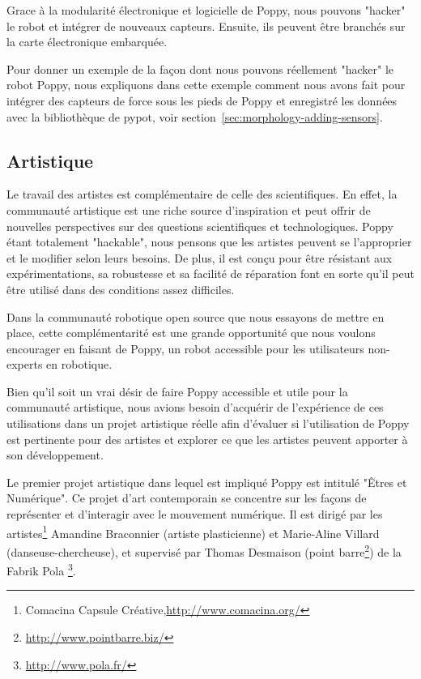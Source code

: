 \begin{description}
    Grace à la modularité électronique et logicielle de Poppy, nous pouvons "hacker" le robot et intégrer de nouveaux capteurs. Ensuite, ils peuvent être branchés sur la carte électronique embarquée.

    Pour donner un exemple de la façon dont nous pouvons réellement "hacker" le robot Poppy, nous expliquons dans cette exemple comment nous avons fait pour intégrer des capteurs de force sous les pieds de Poppy et enregistré les données avec la bibliothèque de pypot, voir section~\ref{sec:morphology-adding-sensors}.
\end{description}

\subsection*{Artistique} %

Le travail des artistes est complémentaire de celle des scientifiques. En effet, la communauté artistique est une riche source d'inspiration et peut offrir de nouvelles perspectives sur des questions scientifiques et technologiques. 
Poppy étant totalement "hackable", nous pensons que les artistes peuvent se l'approprier et le modifier selon leurs besoins. De plus, il est conçu pour être résistant aux expérimentations, sa robustesse et sa facilité de réparation font en sorte qu'il peut être utilisé dans des conditions assez difficiles.

Dans la communauté robotique open source que nous essayons de mettre en place, cette complémentarité est une grande opportunité que nous voulons encourager en faisant de Poppy, un robot accessible pour les utilisateurs non-experts en robotique.

Bien qu'il soit un vrai désir de faire Poppy accessible et utile pour la communauté artistique, nous avions besoin d'acquérir de l'expérience de ces utilisations dans un projet artistique réelle afin d'évaluer si l'utilisation de Poppy est pertinente pour des artistes et explorer ce que les artistes peuvent apporter à son développement.


Le premier projet artistique dans lequel est impliqué Poppy est intitulé "Êtres et Numérique". Ce projet d'art contemporain se concentre sur les façons de représenter et d'interagir avec le mouvement numérique. Il est dirigé par les artistes\footnote{Comacina Capsule Créative,\url{http://www.comacina.org/}} Amandine Braconnier (artiste plasticienne) et Marie-Aline Villard (danseuse-chercheuse), et supervisé par Thomas Desmaison (point barre\footnote{\url{http://www.pointbarre.biz/}}) de la Fabrik Pola \footnote{\url{http://www.pola.fr/}}.



